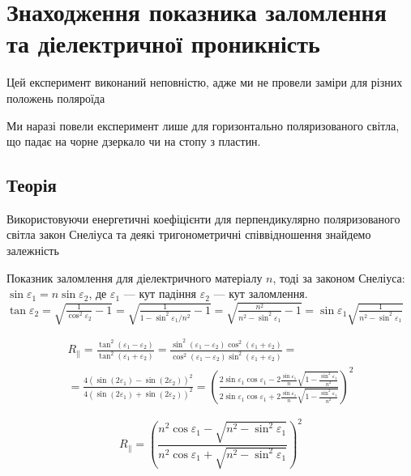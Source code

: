 	\section{Знаходження показника заломлення та діелектричної проникність}
	
	Цей експеримент виконаний неповністю, адже ми не провели заміри для різних положень поляроїда
	
	Ми наразі повели експеримент лише для горизонтально поляризованого світла, що падає на чорне дзеркало чи на стопу з пластин.
	
	\subsection{Теорія}
	
	Використовуючи енергетичні коефіцієнти для перпендикулярно поляризованого світла закон Снеліуса та деякі тригонометричні співвідношення знайдемо залежність
	
	Показник заломлення для діелектричного матеріалу $n$, тоді за законом Снеліуса: $\sin\varepsilon_1=n\sin\varepsilon_2$, де $\varepsilon_1$ --- кут падіння $\varepsilon_2$ --- кут заломлення. $\tan\varepsilon_2=\sqrt{\frac{1}{\cos^2\varepsilon_2}-1}=\sqrt{\frac{1}{1-\sin^2\varepsilon_1/n^2}-1}=\sqrt{\frac{n^2}{n^2-\sin^2\varepsilon_1}-1}=\sin\varepsilon_1\sqrt{\frac{1}{n^2-\sin^2\varepsilon_1}}$
	
	\begin{multline*}
		\label{eq:EnergCoefCulc}
		R_{\parallel}=\frac{\tan^2(\varepsilon_1-\varepsilon_2)}{\tan^2(\varepsilon_1+\varepsilon_2)}=\frac{\sin^2(\varepsilon_1-\varepsilon_2)\cos^2(\varepsilon_1+\varepsilon_2)}{\cos^2(\varepsilon_1-\varepsilon_2)\sin^2(\varepsilon_1+\varepsilon_2)}=\\
		=\frac{4\left(\sin(2\varepsilon_1)-\sin(2\varepsilon_2)\right)^2}{4\left(\sin(2\varepsilon_1)+\sin(2\varepsilon_2)\right)^2}
		=\left(\frac{2\sin\varepsilon_1\cos\varepsilon_1-2\frac{\sin\varepsilon_1}{n}\sqrt{1-\frac{\sin^2\varepsilon_1}{n^2}}}{2\sin\varepsilon_1\cos\varepsilon_1+2\frac{\sin\varepsilon_1}{n}\sqrt{1-\frac{\sin^2\varepsilon_1}{n^2}}}\right)^2
	\end{multline*}
	
	\begin{equation}
		\label{eq:EnergCoef}
		R_{\parallel}=\left(\frac{n^2\cos\varepsilon_1-\sqrt{n^2-\sin^2\varepsilon_1}}{n^2\cos\varepsilon_1+\sqrt{n^2-\sin^2\varepsilon_1}}\right)^2
	\end{equation}
	
